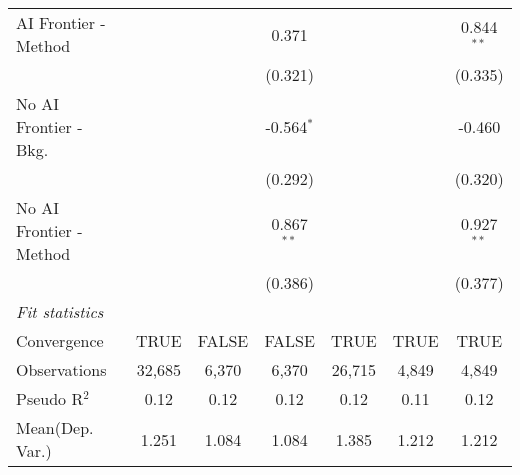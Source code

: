 \begin{tabular}{lcccccc}
   AI Frontier - Method    &               &             & 0.371         &               &              & 0.844$^{**}$\\   
                           &               &             & (0.321)       &               &              & (0.335)\\   
   No AI Frontier - Bkg.   &               &             & -0.564$^{*}$  &               &              & -0.460\\   
                           &               &             & (0.292)       &               &              & (0.320)\\   
   No AI Frontier - Method &               &             & 0.867$^{**}$  &               &              & 0.927$^{**}$\\   
                           &               &             & (0.386)       &               &              & (0.377)\\   
   \midrule
   \emph{Fit statistics}\\
   Convergence             &TRUE           & FALSE       & FALSE         & TRUE          & TRUE         & TRUE\\  
   Observations            & 32,685        & 6,370       & 6,370         & 26,715        & 4,849        & 4,849\\  
   Pseudo R$^2$            & 0.12          & 0.12        & 0.12          & 0.12          & 0.11         & 0.12\\  
Mean(Dep. Var.) & 1.251 & 1.084 & 1.084 & 1.385 & 1.212 & 1.212 \\
   

\end{tabular}
